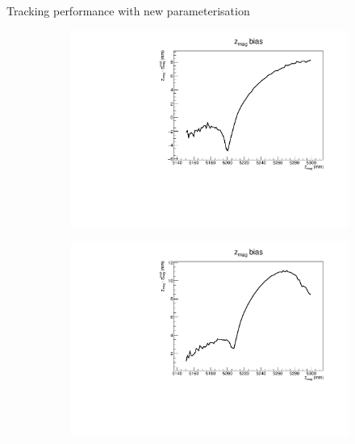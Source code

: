 \documentclass[xcolor={dvipsnames}]{beamer}
\begin{document}
\begin{frame}{Tracking performance with new parameterisation}
  \vspace{0.0cm}
  \begin{figure}[htb]
    \centering
    \begin{subfigure}{0.4\textwidth}
      \includegraphics[width=1\textwidth]{Plots/z_mag_position_bias_old_parameterisation.pdf}
    \end{subfigure}%
    \begin{subfigure}{0.4\textwidth}
      \includegraphics[width=1\textwidth]{Plots/z_mag_position_bias_old_parameterisation_new_MC.pdf}
    \end{subfigure}
    \begin{subfigure}{0.4\textwidth}

\end{subfigure}
\end{figure}
\end{frame}
\end{document}
